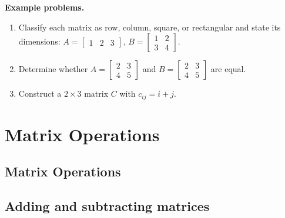 \textbf{Example problems.}
\begin{enumerate}
    \item Classify each matrix as row, column, square, or rectangular and
          state its dimensions:
          $A=\begin{bmatrix}1&2&3\end{bmatrix}$,\;
          $B=\begin{bmatrix}1&2\\3&4\end{bmatrix}$.
    \item Determine whether $A=\begin{bmatrix}2&3\\4&5\end{bmatrix}$ and
          $B=\begin{bmatrix}2&3\\4&5\end{bmatrix}$ are equal.
    \item Construct a $2\times3$ matrix $C$ with $c_{ij}=i+j$.
\end{enumerate}



\section{Matrix Operations}
\label{sec:matr-c72f}



\subsection{Matrix Operations}
\label{sss:matr-c72f}





\subsection{Adding and subtracting matrices}
\label{sss:addi-560e}




